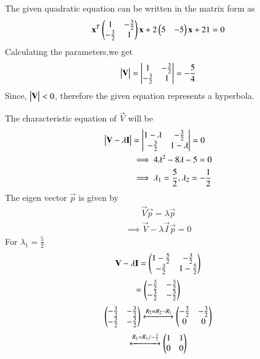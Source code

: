 The given quadratic equation can be written in the matrix form as
\begin{align}
    \mathbf{x}^T\begin{pmatrix}1&-\frac{3}{2}\\-\frac{3}{2}&1\end{pmatrix}\mathbf{x}+2\begin{pmatrix}5&-5\end{pmatrix}\mathbf{x}+21=0\label{eq:solutions/41/ex2/eq:1}
\end{align}
Calculating the parameters,we get
\begin{align}
    \begin{vmatrix}\mathbf{V}\end{vmatrix}=\begin{vmatrix}1&-\frac{3}{2}\\-\frac{3}{2}&1\end{vmatrix}=-\frac{5}{4}
\end{align}
Since, $\begin{vmatrix}\mathbf{V}\end{vmatrix} < 0$, therefore the given  equation represents a hyperbola.\par
The characteristic equation of $\vec{V}$ will be
\begin{align}
    \begin{vmatrix}\mathbf{V}-\lambda\mathbf{I}\end{vmatrix}&=\begin{vmatrix}1-\lambda&-\frac{3}{2}\\-\frac{3}{2}&1-\lambda\end{vmatrix}=0\\
    &\implies 4\lambda^2-8\lambda-5 =0 \\
   &\implies\lambda_1=\frac{5}{2},\lambda_2=-\frac{1}{2}\label{eq:solutions/41/ex2/eq 2}
\end{align}
The eigen vector $\vec{p}$ is given by
\begin{align}
 \vec{V}\vec{p}=\lambda\vec{p}
\end{align}
\begin{align}
  \implies{\vec{V}-\lambda\vec{I}} \vec{p}=0 \label{eq:solutions/41/ex2/eq 3} 
\end{align}
For $\lambda_1 = \frac{5}{2} $
\begin{align}
\mathbf{V}-\lambda\mathbf{I}= \begin{pmatrix}1-\frac{5}{2}&-\frac{3}{2}\\-\frac{3}{2}&1-\frac{5}{2}\end{pmatrix}
    \end{align}
    \begin{align}
 =\begin{pmatrix}-\frac{3}{2}&-\frac{3}{2}\\-\frac{3}{2}&-\frac{3}{2}\end{pmatrix}
    \end{align}
    \begin{align}
    \begin{pmatrix}-\frac{3}{2}&-\frac{3}{2}\\-\frac{3}{2}&-\frac{3}{2}\end{pmatrix}\xleftrightarrow{R_2=R_2-R_1}\begin{pmatrix}-\frac{3}{2}&-\frac{3}{2}\\ 0 &0\end{pmatrix}
\end{align}
 \begin{align}
    \xleftrightarrow{R_1=R_1/-\frac{3}{2}}\begin{pmatrix}1&1\\ 0 &0\end{pmatrix}\label{eq:solutions/41/ex2/eq 4}
   \end{align}
